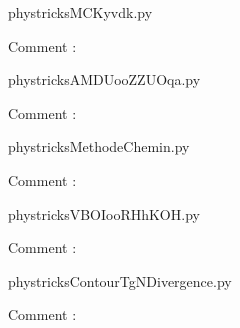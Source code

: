 
    \newcommand{\CaptionFigMCKyvdk}{<+Type your caption here+>}
    \begin{center}
        
    \end{center}
    phystricksMCKyvdk.py

    Comment : 

    \clearpage
    


    \newcommand{\CaptionFigAMDUooZZUOqa}{<+Type your caption here+>}
    \begin{center}
        
    \end{center}
    phystricksAMDUooZZUOqa.py

    Comment : 

    \clearpage
    


    \newcommand{\CaptionFigMethodeChemin}{<+Type your caption here+>}
    \begin{center}
        
    \end{center}
    phystricksMethodeChemin.py

    Comment : 

    \clearpage
    


    \newcommand{\CaptionFigVBOIooRHhKOH}{<+Type your caption here+>}
    \begin{center}
        
    \end{center}
    phystricksVBOIooRHhKOH.py

    Comment : 

    \clearpage
    


    \newcommand{\CaptionFigContourTgNDivergence}{<+Type your caption here+>}
    \begin{center}
        
    \end{center}
    phystricksContourTgNDivergence.py

    Comment : 

    \clearpage
    


